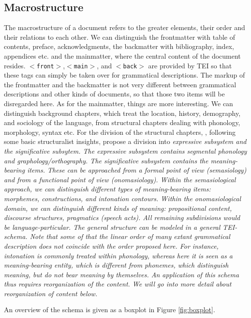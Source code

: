 \documentclass[a4paper,10pt]{article}
\newcommand{\teitag}[1]{\texttt{$<$#1$>$}}
\begin{document}
\subsection{Macrostructure}
The macrostructure of a document refers to the greater elements, their order and their relations to each other. We can distinguish the frontmatter with table of contents, preface, acknowledgments, the backmatter with bibliography, index, appendices etc. and the mainmatter, where the central content of the document resides. \teitag{front},\teitag{main}, and \teitag{back} are provided by TEI so that these tags can simply be taken over for grammatical descriptions. The markup of the frontmatter and the backmatter is not very different between grammatical descriptions  and other kinds of documents, so that those two items will be disregarded here. As for the mainmatter, things are more interesting. We can distinguish background chapters, which treat the location, history, demography, and sociology of the language, from structural chapters dealing with phonology, morphology, syntax etc. For the division of the structural chapters, \citet{LehmannEtAl2004}, following some basic structuralist insights, propose a division into \em expressive subsystem \em and the \em significative subsytem\em. The expressive subsystem contains segmental phonology and graphology/orthography. The significative subsystem contains the meaning-bearing items. These can be approached from a formal point of view (semasiology) and from a functional point of view (onomasiology). Within the semasiological approach, we can distinguish different types of meaning-bearing items: morphemes, constructions, and intonation contours. Within the onomasiological domain, we can distinguish different kinds of meaning: propositional content, discourse structures, pragmatics (speech acts). All remaining subdivisions would be language-particular. The general structure can be modeled in a general TEI-schema. Note that some of that the linear order of many extant grammatical description does not coincide with the order proposed here. For instance, intonation is commonly treated within phonology, whereas here it is seen as a meaning-bearing entity, which is different from phonemes, which distinguish meaning, but do not bear meaning by themselves. An application of this schema thus requires reorganization of the content. We will go into more detail about reorganization of content below.

An overview of the schema is given as a boxplot in Figure \ref{fig:boxplot}.
\end{document}
